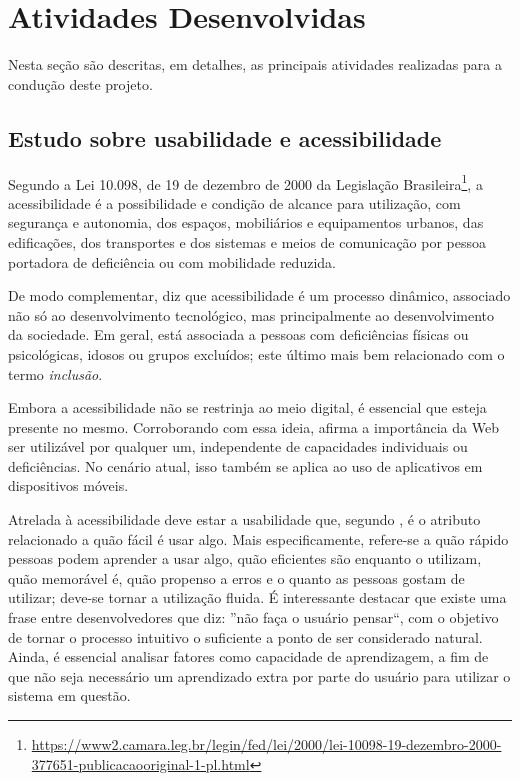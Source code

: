 \chapter{Atividades Desenvolvidas}\label{sec:ativ_desenvolvidas}
Nesta seção são descritas, em detalhes, as principais atividades realizadas para a condução deste projeto.


\section{Estudo sobre usabilidade e acessibilidade}\label{sec:estudos_usab_acess} 


Segundo a Lei 10.098, de 19 de dezembro de 2000 da Legislação Brasileira\footnote{\url{https://www2.camara.leg.br/legin/fed/lei/2000/lei-10098-19-dezembro-2000-377651-publicacaooriginal-1-pl.html}}, a acessibilidade é a possibilidade e condição de alcance para utilização, com segurança e autonomia, dos
espaços, mobiliários e equipamentos urbanos, das edificações, dos transportes e dos sistemas e meios de comunicação por pessoa portadora de deficiência ou com mobilidade reduzida. 

De modo complementar, \cite{torres2002acessibilidade} diz que acessibilidade é um processo dinâmico, associado não só ao desenvolvimento tecnológico, mas principalmente ao desenvolvimento da sociedade. Em geral, está associada a pessoas com deficiências físicas ou psicológicas, idosos ou grupos excluídos; este último mais bem relacionado com o termo \textit{inclusão}. 

Embora a acessibilidade não se restrinja ao meio digital, é essencial que esteja presente no mesmo. Corroborando com essa ideia, \cite{leew3c} afirma a importância da Web ser utilizável por qualquer um, independente de capacidades individuais ou deficiências. No cenário atual, isso também se aplica ao uso de aplicativos em dispositivos móveis. 

Atrelada à acessibilidade deve estar a usabilidade que, segundo \cite{nielsenPrioritizingWebUsability},
é o atributo relacionado a quão fácil é usar algo. Mais especificamente, refere-se a quão rápido pessoas podem aprender a usar algo, quão eficientes são enquanto o utilizam, quão memorável é, quão propenso a erros e o quanto as pessoas gostam de utilizar; deve-se tornar a utilização fluida. É interessante destacar que existe uma frase entre desenvolvedores que diz: ''não faça o usuário pensar``, com o objetivo de tornar o processo intuitivo o suficiente a ponto de ser considerado natural.
Ainda, é essencial analisar fatores como capacidade de aprendizagem, a fim de que não seja necessário um aprendizado extra por parte do usuário para utilizar o sistema em questão.

